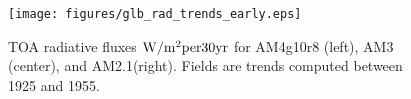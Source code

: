 \documentclass[grl]{agutex2015}
\begin{document}
\begin{figure}
  \texttt{[image: figures/glb\_rad\_trends\_early.eps]}
  \caption{TOA radiative fluxes $\rm{W/m^2 per 30yr}$ for AM4g10r8 (left), AM3 (center), and AM2.1(right).  Fields are trends computed between 1925 and 1955.}
\end{figure}


%

\end{document}
